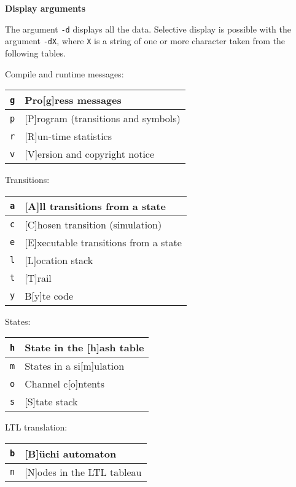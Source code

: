 \documentclass[11pt]{article}
\newcommand*{\p}[1]{\texttt{#1}}
\begin{document}
\medskip

\textbf{Display arguments}

The argument \p{-d} displays all the data. Selective display is possible
with the argument \p{-dX}, where \p{X} is a string of one or more
character taken from the following tables.

Compile and runtime messages:
\begin{center}
\begin{tabular}{|l|p{}|}
\hline
\p{g} & Pro[g]ress messages\\\hline
\p{p} & [P]rogram (transitions and symbols)\\\hline
\p{r} & [R]un-time statistics\\\hline
\p{v} & [V]ersion and copyright notice\\\hline
\end{tabular}
\end{center}

\pagebreak[3]

Transitions:
\begin{center}
\begin{tabular}{|l|p{}|}
\hline
\p{a} & [A]ll transitions from a state\\\hline
\p{c} & [C]hosen transition (simulation)\\\hline
\p{e} & [E]xecutable transitions from a state\\\hline
\p{l} & [L]ocation stack\\\hline
\p{t} & [T]rail\\\hline
\p{y} & B[y]te code\\\hline
\end{tabular}
\end{center}

\pagebreak[3]

States:
\begin{center}
\begin{tabular}{|l|p{}|}
\hline
\p{h} & State in the [h]ash table\\\hline
\p{m} & States in a si[m]ulation\\\hline
\p{o} & Channel c[o]ntents\\\hline
\p{s} & [S]tate stack\\\hline
\end{tabular}
\end{center}

LTL translation:
\begin{center}
\begin{tabular}{|l|p{}|}
\hline
\p{b} & [B]\"{u}chi automaton\\\hline
\p{n} & [N]odes in the LTL tableau\\\hline
\end{tabular}
\end{center}
\end{document}
